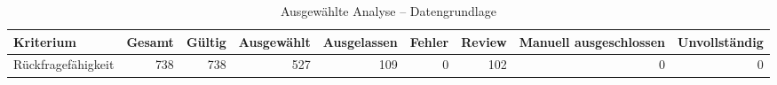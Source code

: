 \begin{table}[htbp]
\centering
\caption{Ausgewählte Analyse -- Datengrundlage}
\begin{tabular}{lrrrrrrrr}
\toprule
Kriterium & Gesamt & Gültig & Ausgewählt & Ausgelassen & Fehler & Review & Manuell ausgeschlossen & Unvollständig \\
\midrule
Rückfragefähigkeit & 738 & 738 & 527 & 109 & 0 & 102 & 0 & 0 \\
\bottomrule
\end{tabular}
\end{table}
